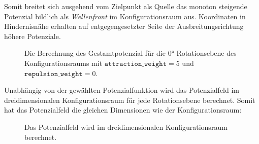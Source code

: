 Somit breitet sich ausgehend vom Zielpunkt als Quelle das monoton steigende Potenzial bildlich als \textit{Wellenfront} im Konfigurationsraum aus.
Koordinaten in Hindernisnähe erhalten auf entgegengesetzter Seite der Ausbreitungsrichtung höhere Potenziale.

\begin{figure}[H]
	\centering
	\footnotesize
	\centerline{}
	\caption{Die Berechnung des Gestamtpotenzial für die $0$°-Rotationsebene des Konfigurationsraums mit $\texttt{attraction\_weight}=5$ und $\texttt{repulsion\_weight}=0$.}
\end{figure}

\vspace*{1cm}
Unabhängig von der gewählten Potenzialfunktion wird das Potenzialfeld im dreidimensionalen Konfigurationsraum für jede Rotationsebene berechnet.
Somit hat das Potenzialfeld die gleichen Dimensionen wie der Konfigurationsraum:

\begin{figure}[H]
	\centering
	\footnotesize
	\centerline{}
	\caption{Das Potenzialfeld wird im dreidimensionalen Konfigurationsraum berechnet.}
\end{figure}


